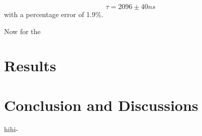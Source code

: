 \documentclass{article}
\begin{document}
\begin{multicols}{2}
\begin{equation}
    \tau = 2096 \pm 40 ns
\end{equation}
with a percentage error of 1.9\%.


Now for the 

\section{\label{results}Results}

\section{\label{Conclusion}Conclusion and Discussions}

hihi-\cite{ROOT}

\end{multicols}


\end{document}
